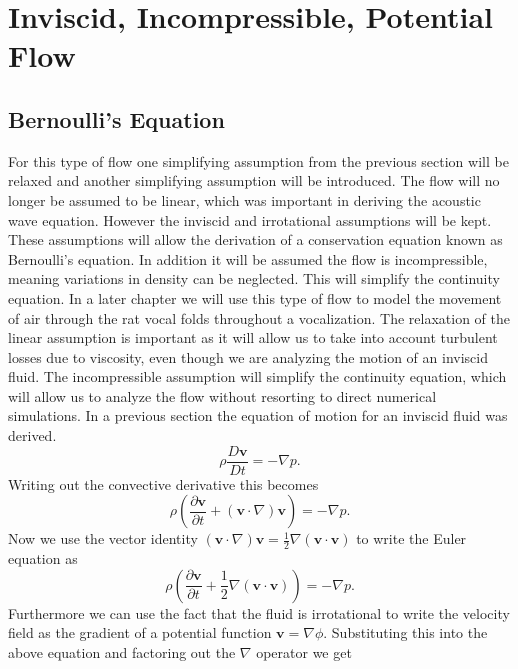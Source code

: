 \documentclass[12pt, letter]{report}
\begin{document}
\section{Inviscid, Incompressible, Potential Flow}
\subsection{Bernoulli's Equation}
For this type of flow one simplifying assumption from the previous section will be relaxed and another simplifying assumption will be introduced. The flow will no longer be assumed to be linear, which was important in deriving the acoustic wave equation. However the inviscid and irrotational assumptions will be kept. These assumptions will allow the derivation of a conservation equation known as Bernoulli's equation. In addition it will be assumed the flow is incompressible, meaning variations in density can be neglected. This will simplify the continuity equation. In a later chapter we will use this type of flow to model the movement of air through the rat vocal folds throughout a vocalization. The relaxation of the linear assumption is important as it will allow us to take into account turbulent losses due to viscosity, even though we are analyzing the motion of an inviscid fluid. The incompressible assumption will simplify the continuity equation, which will allow us to analyze the flow without resorting to direct numerical simulations. In a previous section the equation of motion for an inviscid fluid was derived.
\begin{equation}
\rho \frac{D \textbf{v}}{D t} = -\nabla p.
\end{equation}
Writing out the convective derivative this becomes
\begin{equation}
\rho \left( \frac{\partial  \textbf{v}}{\partial t} +  (\textbf{v} \cdot \nabla)  \textbf{v} \right) = -\nabla p.
\end{equation}
Now we use the vector identity $(\textbf{v} \cdot \nabla)  \textbf{v}=\frac{1}{2} \nabla ( \textbf{v} \cdot \textbf{v} )$ to write the Euler equation as
\begin{equation}
\rho \left( \frac{\partial  \textbf{v}}{\partial t} +  \frac{1}{2} \nabla ( \textbf{v} \cdot \textbf{v} ) \right) = -\nabla p.
\end{equation}
Furthermore we can use the fact that the fluid is irrotational to write the velocity field as the gradient of a potential function $ \textbf{v} = \nabla \phi$. Substituting this into the above equation and factoring out the $\nabla$ operator we get
\end{document}
